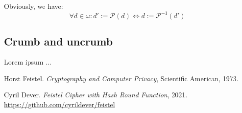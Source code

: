 \documentclass[twoside,twocolumn]{article}
\theoremstyle{definition}
\theoremstyle{remark}
\begin{document}
Obviously, we have: $$\forall d \in \omega: d' := \mathcal{P}(d) \iff d := \mathcal{P}^{-1}(d')$$

\subsection{Crumb and uncrumb}

Lorem ipsum ... %

\tableofcontents %


\begin{thebibliography}{99} %

Horst Feistel. \emph{Cryptography and Computer Privacy}, Scientific American, 1973.

Cyril Dever. \emph{Feistel Cipher with Hash Round Function}, 2021.
\\\small\url{https://github.com/cyrildever/feistel}

\end{thebibliography}

\end{document}
